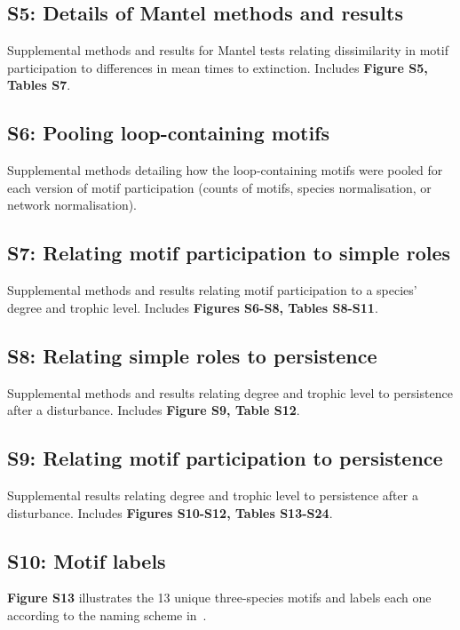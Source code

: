 \documentclass[12pt]{article}
\begin{document}
    \subsection*{S5: Details of Mantel methods and results}

    	Supplemental methods and results for Mantel tests relating dissimilarity in motif participation to differences in mean times to extinction. Includes \textbf{Figure S5, Tables S7}.


    \subsection*{S6: Pooling loop-containing motifs}

    	Supplemental methods detailing how the loop-containing motifs were pooled for each version of motif participation (counts of motifs, species normalisation, or network normalisation).


    \subsection*{S7: Relating motif participation to simple roles}

    	Supplemental methods and results relating motif participation to a species' degree and trophic level. Includes \textbf{Figures S6-S8, Tables S8-S11}.


    \subsection*{S8: Relating simple roles to persistence}

        Supplemental methods and results relating degree and trophic level to persistence after a disturbance. Includes \textbf{Figure S9, Table S12}.


    \subsection*{S9: Relating motif participation to persistence}

    	Supplemental results relating degree and trophic level to persistence after a disturbance. Includes \textbf{Figures S10-S12, Tables S13-S24}.

    \subsection*{S10: Motif labels}
        
        \textbf{Figure S13} illustrates the 13 unique three-species motifs and labels each one according to the naming scheme in~\citet{Stouffer2007}.
\end{document}
